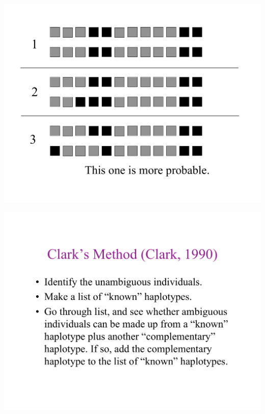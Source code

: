 \newslide{}
\mbox{}
\vspace*{\VertUp}
\enlargethispage*{1000pt}
\begin{center}
\includegraphics*[width=\textwidth]{PPT_pages/pg_0019.pdf}
\end{center}


\newslide{}
\mbox{}
\vspace*{\VertUp}
\enlargethispage*{1000pt}
\begin{center}
\includegraphics*[width=\textwidth]{PPT_pages/pg_0020.pdf}
\end{center}


